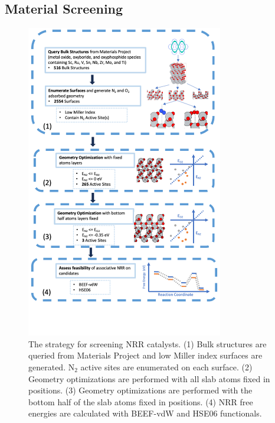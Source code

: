 \subsection{Material Screening}
\begin{figure}
\begin{center}
\includegraphics[width=8.6cm]{figures/metal_oxide_figures/Figure 1.png}
\caption{The strategy for screening NRR catalysts. (1) Bulk structures are queried from Materials Project and low Miller index surfaces are generated. N$_2$ active sites are enumerated on each surface. (2) Geometry optimizations are performed with all slab atoms fixed in positions. (3) Geometry optimizations are performed with the bottom half of the slab atoms fixed in positions. (4) NRR free energies are calculated with BEEF-vdW and HSE06 functionals.}
\label{fig:screening_workflow}
\end{center}
\end{figure}

